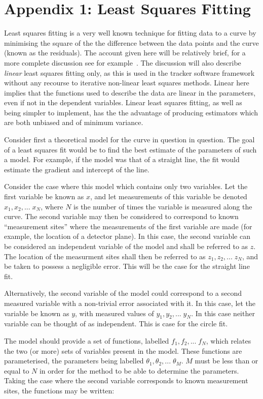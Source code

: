\section{Appendix 1: Least Squares Fitting}
\label{sec:LSQ}
Least squares fitting is a very well known technique for fitting data to a curve by minimising the square of the the difference between the data points and the curve (known as the residuals).  The account given here will be relatively brief, for a more complete discussion see for example~\cite{Frodensen}. The discussion will also describe \textit{linear} least squares fitting only, as this is used in the tracker software framework without any recourse to iterative non-linear least squares methods. Linear here implies that the functions used to describe the data are linear in the parameters, even if not in the dependent variables. Linear least squares fitting, as well as being simpler to implement, has the the advantage of producing estimators which are both unbiased and of minimum variance. 

Consider first a theoretical model for the curve in question in question.  The goal of a least squares fit would be to find the best estimate of the parameters of such a model. For example, if the model was that of a straight line, the fit would estimate the gradient and intercept of the line. 

Consider the case where this model which contains only two variables. Let the first variable be known as $x$, and let measurements of this variable be denoted $x_1, x_2, ...\; x_N$, where $N$ is the number of times the variable is measured along the curve. The second variable may then be considered to correspond to known ``measurement sites'' where the measurements of the first variable are made (for example, the location of a detector plane). In this case, the second variable can be considered an independent variable of the model and shall be referred to as $z$. The location of the measurment sites shall then be referred to as $z_1, z_2, ...\; z_N$, and be taken to possess a negligible error.  This will be the case for the straight line fit.  

Alternatively, the second variable of the model could correspond to a second measured variable with a non-trivial error associated with it.  In this case, let the variable be known as $y$, with measured values of $y_1, y_2, ...\; y_N$. In this case neither variable can be thought of as independent. This is case for the circle fit.

The model should provide a set of functions, labelled $f_1, f_2, ...\; f_N$, which relates the two (or more) sets of variables present in the model.  These functions are parameterised, the parameters being labelled $\theta_1, \theta_2, ...\; \theta_M$. $M$ must be less than or equal to $N$ in order for the method to be able to determine the parameters. Taking the case where the second variable corresponds to known measurement sites, the functions may be written:

